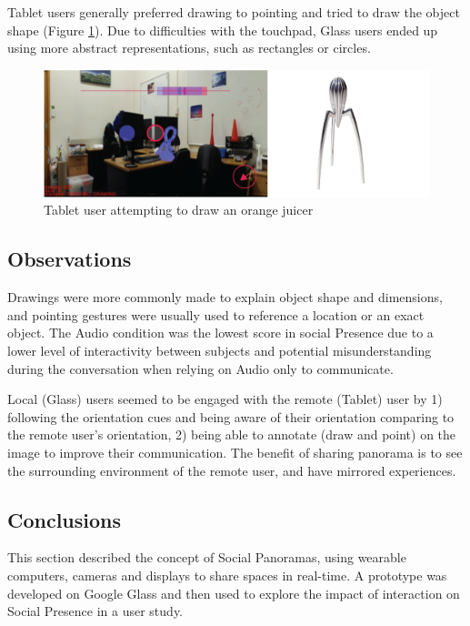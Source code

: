 Tablet users generally preferred drawing to pointing and tried to draw the object shape (Figure \ref{fig:ismar14:tablet-drawing}). Due to difficulties with the touchpad, Glass users ended up using more abstract representations, such as rectangles or circles.

\begin{figure}
    \centering
    \includegraphics[width=\linewidth]{images/63-pano-ismar14/tablet-drawing}
    \caption{Tablet user attempting to draw an orange juicer}
    \label{fig:ismar14:tablet-drawing}
\end{figure}

\subsection{Observations}

Drawings were more commonly made to explain object shape and dimensions, and pointing gestures were usually used to reference a location or an exact object. The Audio condition was the lowest score in social Presence due to a lower level of interactivity between subjects and potential misunderstanding during the conversation when relying on Audio only to communicate. 

Local (Glass) users seemed to be engaged with the remote (Tablet) user by 1) following the orientation cues and being aware of their orientation comparing to the remote user's orientation, 2) being able to annotate (draw and point) on the image to improve their communication. The benefit of sharing panorama is to see the surrounding environment of the remote user, and have mirrored experiences.

\subsection{Conclusions}

This section described the concept of Social Panoramas, using wearable computers, cameras and displays to share spaces in real-time. A prototype was developed on Google Glass and then used to explore the impact of interaction on Social Presence in a user study. 

